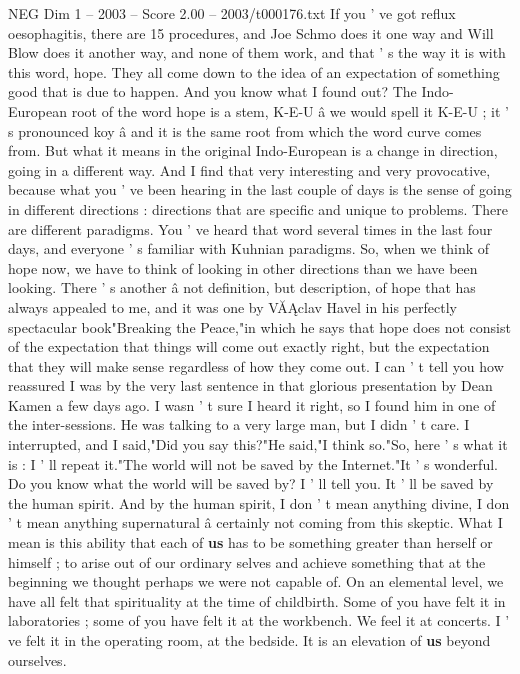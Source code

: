 \begin{textsample}{NEG Dim 1 – 2003 – Score 2.00 – 2003/t000176.txt}
If you ' ve got reflux oesophagitis, there are 15 procedures, and Joe Schmo does it one way and Will Blow does it another way, and none of them work, and that ' s the way it is with this word, hope.
They all come down to the idea of an expectation of something good that is due to happen.
And you know what I found out?
The Indo- European root of the word hope is a stem, K-E-U â we would spell it K-E-U ; it ' s pronounced koy â and it is the same root from which the word curve comes from.
But what it means in the original Indo-European is a change in direction, going in a different way.
And I find that very interesting and very provocative, because what you ' ve been hearing in the last couple of days is the sense of going in different directions : directions that are specific and unique to problems.
There are different paradigms.
You ' ve heard that word several times in the last four days, and everyone ' s familiar with Kuhnian paradigms.
So, when we think of hope now, we have to think of looking in other directions than we have been looking.
There ' s another â not definition, but description, of hope that has always appealed to me, and it was one by VĂĄclav Havel in his perfectly spectacular book"Breaking the Peace,"in which he says that hope does not consist of the expectation that things will come out exactly right, but the expectation that they will make sense regardless of how they come out.
I can ' t tell you how reassured I was by the very last sentence in that glorious presentation by Dean Kamen a few days ago.
I wasn ' t sure I heard it right, so I found him in one of the inter-sessions.
He was talking to a very large man, but I didn ' t care.
I interrupted, and I said,"Did you say this?"He said,"I think so."So, here ' s what it is : I ' ll repeat it."The world will not be saved by the Internet."It ' s wonderful.
Do you know what the world will be saved by?
I ' ll tell you.
It ' ll be saved by the human spirit.
And by the human spirit, I don ' t mean anything divine, I don ' t mean anything supernatural â certainly not coming from this skeptic.
What I mean is this ability that each of \textbf{us} has to be something greater than herself or himself ; to arise out of our ordinary selves and achieve something that at the beginning we thought perhaps we were not capable of.
On an elemental level, we have all felt that spirituality at the time of childbirth.
Some of you have felt it in laboratories ; some of you have felt it at the workbench.
We feel it at concerts.
I ' ve felt it in the operating room, at the bedside.
It is an elevation of \textbf{us} beyond ourselves.

\end{textsample}
